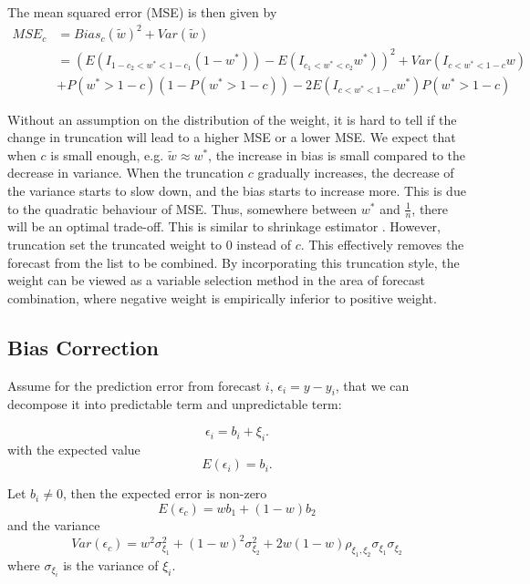 \documentclass[11pt]{article}
\begin{document}
The mean squared error (MSE) is then given by 
\begin{equation}
\label{eqn: MSE trunc}
\begin{aligned}
MSE_c &= Bias_c(\tilde{w})^2 + Var(\tilde{w})\\
&=(E(I_{1-c_2<w^*<1-c_1}(1-w^*))-E(I_{c_1<w^*<c_2}w^*))^2 + Var(I_{c<w^*<1-c}w)\\ & + P(w^*>1-c)(1-P(w^*>1-c)) - 2E(I_{c<w^*<1-c}w^*)P(w^*>1-c)
\end{aligned}
\end{equation}

Without an assumption on the distribution of the weight, it is hard to tell if the change in truncation will lead to a higher MSE or a lower MSE. We expect that when $c$ is small enough, e.g. $\tilde{w}\approx w^*$, the increase in bias is small compared to the decrease in variance. When the truncation $c$ gradually increases, the decrease of the variance starts to slow down, and the bias starts to increase more. This is due to the quadratic behaviour of MSE. Thus, somewhere between $w^*$ and $\frac{1}{n}$, there will be an optimal trade-off. This is similar to shrinkage estimator \citep{James1961}. However, truncation set the truncated weight to 0 instead of $c$. This effectively removes the forecast from the list to be combined. By incorporating this truncation style, the weight can be viewed as a variable selection method in the area of forecast combination, where negative weight is empirically inferior to positive weight. 

\subsection{Bias Correction}\label{bias-correction}

Assume for the prediction error from forecast \(i\),
\(\epsilon_i = y - y_i\), that we can decompose it into predictable term
and unpredictable term:

\begin{equation}
\label{eqn: w bias assumption}
\epsilon_i = b_i + \xi_i. 
\end{equation}
with the expected value
\begin{equation}
\label{eqn: bias estimate}
E(\epsilon_i) = b_i.
\end{equation}

Let $b_i \neq 0$, then the expected error is non-zero
\begin{equation}
E(\epsilon_c) = wb_1+(1-w)b_2
\end{equation}
and the variance
\begin{equation}
Var(\epsilon_c) = w^2\sigma^2_{\xi_1} + (1-w)^2\sigma^2_{\xi_2} + 2w(1-w)\rho_{\xi_1,\xi_2}\sigma_{\xi_1}\sigma_{\xi_2}
\end{equation}
where $\sigma_{\xi_i}$ is the variance of $\xi_i$.
\end{document}
